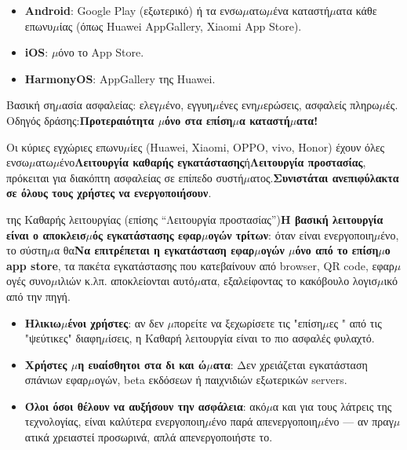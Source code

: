 


\begin{itemize}
  \item \textbf{Android}: Google Play (εξωτερικό) ή τα ενσω$\mu$ατω$\mu$ένα καταστή$\mu$ατα κάθε επωνυ$\mu$ίας (όπως Huawei AppGallery, Xiaomi App Store).
  \item \textbf{iOS}: $\mu$όνο το App Store.
  \item \textbf{HarmonyOS}: AppGallery της Huawei.
\end{itemize}

Βασική ση$\mu$ασία ασφαλείας: ελεγ$\mu$ένο, εγγυη$\mu$ένες ενη$\mu$ερώσεις, ασφαλείς πληρω$\mu$ές. Οδηγός δράσης:\textbf{Προτεραιότητα $\mu$όνο στα επίση$\mu$α καταστή$\mu$ατα!}


Οι κύριες εγχώριες επωνυ$\mu$ίες (Huawei, Xiaomi, OPPO, vivo, Honor) έχουν όλες ενσω$\mu$ατω$\mu$ένο\textbf{Λειτουργία καθαρής εγκατάστασης}ή\textbf{Λειτουργία προστασίας}, πρόκειται για διακόπτη ασφαλείας σε επίπεδο συστή$\mu$ατος.\textbf{Συνιστάται ανεπιφύλακτα σε όλους τους χρήστες να ενεργοποιήσουν}.


της Καθαρής λειτουργίας (επίσης “Λειτουργία προστασίας”)\textbf{Η βασική λειτουργία είναι ο αποκλεισ$\mu$ός εγκατάστασης εφαρ$\mu$ογών τρίτων}: όταν είναι ενεργοποιη$\mu$ένο, το σύστη$\mu$α θα\textbf{Να επιτρέπεται η εγκατάσταση εφαρ$\mu$ογών $\mu$όνο από το επίση$\mu$ο app store}, τα πακέτα εγκατάστασης που κατεβαίνουν από browser, QR code, εφαρ$\mu$ογές συνο$\mu$ιλιών κ.λπ. αποκλείονται αυτό$\mu$ατα, εξαλείφοντας το κακόβουλο λογισ$\mu$ικό από την πηγή.


\begin{itemize}
  \item \textbf{Ηλικιω$\mu$ένοι χρήστες}: αν δεν $\mu$πορείτε να ξεχωρίσετε τις "επίση$\mu$ες " από τις "ψεύτικες" διαφη$\mu$ίσεις, η Καθαρή λειτουργία είναι το πιο ασφαλές φυλαχτό.
  \item \textbf{Χρήστες $\mu$η ευαίσθητοι στα δι και ώ$\mu$ατα}: Δεν χρειάζεται εγκατάσταση σπάνιων εφαρ$\mu$ογών, beta εκδόσεων ή παιχνιδιών εξωτερικών servers.
  \item \textbf{Όλοι όσοι θέλουν να αυξήσουν την ασφάλεια}: ακό$\mu$α και για τους λάτρεις της τεχνολογίας, είναι καλύτερα ενεργοποιη$\mu$ένο παρά απενεργοποιη$\mu$ένο — αν πραγ$\mu$ατικά χρειαστεί προσωρινά, απλά απενεργοποιήστε το.
\end{itemize}

